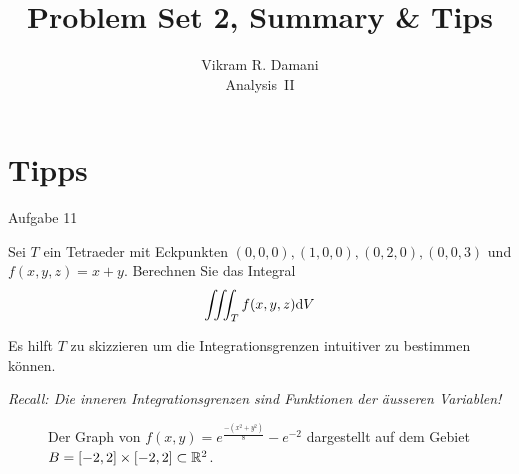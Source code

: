 \documentclass[12pt]{article}
\begin{document}
\title{\vspace*{-2.5em}Problem Set 2, Summary \& Tips}
\author{Vikram R. Damani\\
    Analysis~II}

\maketitle


\section{Tipps}

\begin{nexercise}{Aufgabe 1}{1}
    Sei $T$ ein Tetraeder mit Eckpunkten $(0,0,0), (1,0,0), (0,2,0), (0,0,3)$ und $f(x,y,z)=x+y$. Berechnen Sie das Integral
    \begin{align}
        \iiint_T f(x,y,z)\mathrm{d}V
    \end{align}
\end{nexercise}

\begin{tips}{1} Es hilft $T$ zu skizzieren um die Integrationsgrenzen intuitiver zu bestimmen können.

    \emph{Recall: Die inneren Integrationsgrenzen sind Funktionen der äusseren Variablen!}
\end{tips}\vspace*{1em}

\begin{figure}[htbp!]
    \centering
    \caption{Der Graph von $f(x,y)=e^{\frac{-(x^2+y^2)}{8}}-e^{-2}$ dargestellt auf dem Gebiet $B=[-2,2]\times[-2,2]\subset\mathbb{R}^2$.}
\end{figure}
\end{document}
